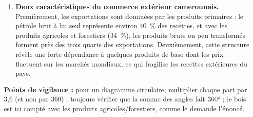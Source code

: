 \documentclass[11pt]{article}
\begin{document}
\begin{corrige}
\begin{enumerate}
\item \textbf{Deux caractéristiques du commerce extérieur camerounais.} Premièrement, les exportations sont dominées par les produits primaires : le pétrole brut à lui seul représente environ 40~\% des recettes, et avec les produits agricoles et forestiers (34~\%), les produits bruts ou peu transformés forment près des trois quarts des exportations. Deuxièmement, cette structure révèle une forte dépendance à quelques produits de base dont les prix fluctuent sur les marchés mondiaux, ce qui fragilise les recettes extérieures du pays.
\end{enumerate}
\textbf{Points de vigilance :} pour un diagramme circulaire, multiplier chaque part par 3,6 (et non par 360) ; toujours vérifier que la somme des angles fait 360° ; le bois est ici compté avec les produits agricoles/forestiers, comme le demande l'énoncé.
\end{corrige}
\end{document}
